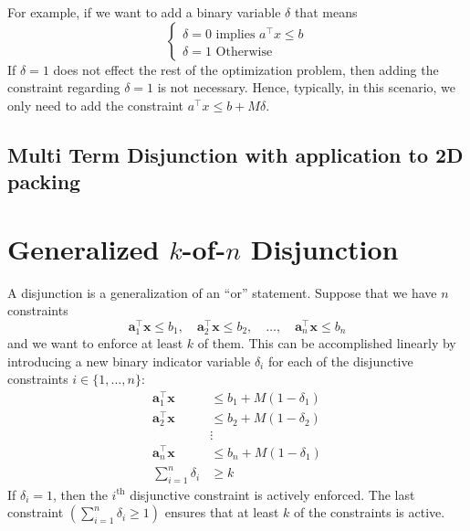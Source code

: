For example, if we want to add a binary variable $\delta$ that means
$$
\begin{cases}
\delta = 0 \text{ implies }  a^\top x \leq b\\
\delta = 1  \text{ Otherwise}
\end{cases}
$$
If $\delta = 1$ does not effect the rest of the optimization problem, then adding the constraint regarding $\delta = 1$ is not necessary.  Hence, typically, in this scenario, we only need to add the constraint $a^\top x \leq b + M \delta$.

\subsection{Multi Term Disjunction with application to 2D packing}

\section{Generalized $k$-of-$n$ Disjunction}
A disjunction is a generalization of an ``or'' statement. Suppose that we have $n$ constraints 
	$$
	\mathbf{a}_1^\top\mathbf{x} \leq b_1, \quad \mathbf{a}_2^\top\mathbf{x} \leq b_2, \quad\dots, \quad \mathbf{a}_n^\top\mathbf{x} \leq b_n
	$$
and we want to enforce at least $k$ of them. This can be accomplished linearly by introducing a new binary indicator variable $\delta_i$ for each of the disjunctive constraints $i \in \{1,\dots,n\}$:
	\begin{align*}
	\mathbf{a}_1^\top\mathbf{x} &\leq b_1+M(1-\delta_1) \\
	\mathbf{a}_2^\top\mathbf{x} &\leq b_2+M(1-\delta_2) \\
								&\vdots 				\\
	\mathbf{a}_n^\top\mathbf{x} &\leq b_n+M(1-\delta_1) \\
	\sum_{i=1}^n\delta_i &\geq k
	\end{align*}
If $\delta_i = 1$, then the $i^\text{th}$ disjunctive constraint is actively enforced. The last constraint $\left(\sum_{i=1}^n\delta_i \geq 1\right)$ ensures that at least $k$ of the constraints is active.

